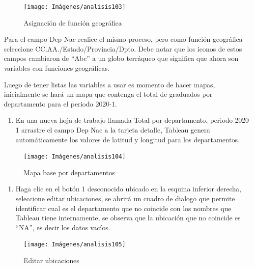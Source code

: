 \documentclass[
]{book}
\providecommand{\tightlist}{%
  \setlength{\itemsep}{0pt}\setlength{\parskip}{0pt}}
\begin{document}
\begin{figure}

{\centering \texttt{[image: Imágenes/analisis103]} 

}

\caption{Asignación de función geográfica}\label{fig:funciongeografica-fig}
\end{figure}

Para el campo Dep Nac realice el mismo proceso, pero como función geográfica seleccione CC.AA./Estado/Provincia/Dpto. Debe notar que los iconos de estos campos cambiaron de ``Abc'' a un globo terráqueo que significa que ahora son variables con funciones geográficas.

Luego de tener listas las variables a usar es momento de hacer mapas, inicialmente se hará un mapa que contenga el total de graduados por departamento para el periodo 2020-1.

\begin{enumerate}
\def\labelenumi{\arabic{enumi}.}
\tightlist
\item
  En una nueva hoja de trabajo llamada Total por departamento, periodo 2020-1 arrastre el campo Dep Nac a la tarjeta detalle, Tableau genera automáticamente los valores de latitud y longitud para los departamentos.
\end{enumerate}

\begin{figure}

{\centering \texttt{[image: Imágenes/analisis104]} 

}

\caption{Mapa base por departamentos}\label{fig:paso1mapeo-fig}
\end{figure}

\begin{enumerate}
\def\labelenumi{\arabic{enumi}.}
\setcounter{enumi}{1}
\tightlist
\item
  Haga clic en el botón 1 desconocido ubicado en la esquina inferior derecha, seleccione editar ubicaciones, se abrirá un cuadro de dialogo que permite identificar cual es el departamento que no coincide con los nombres que Tableau tiene internamente, se observa que la ubicación que no coincide es ``NA'', es decir los datos vacíos.
\end{enumerate}

\begin{figure}

{\centering \texttt{[image: Imágenes/analisis105]} 

}

\caption{Editar ubicaciones}\label{fig:paso2mapeo-fig}
\end{figure}
\end{document}
